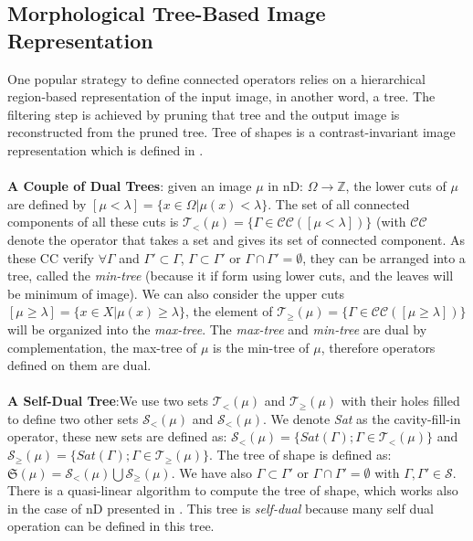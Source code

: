 \subsection{Morphological Tree-Based Image Representation}
One popular strategy to define connected operators relies on a hierarchical region-based representation of the input image, in another word, a tree. The filtering step is achieved by pruning that tree and the output image is reconstructed from the pruned tree.  Tree of shapes is a contrast-invariant image representation which is defined in \cite{Monasse.2000}.
\paragraph{} \textbf{A Couple of Dual Trees}: given an image $\mu $ in nD: $\Omega \rightarrow \mathbb{Z} $, the lower cuts of $\mu$ are defined by 
	$[\mu < \lambda] =\lbrace x \in \Omega \vert \mu (x) < \lambda \rbrace $. The set of all connected components of all these cuts is $ \mathcal{T}_< (\mu) =\lbrace \Gamma \in \mathcal{C}\mathcal{C}([\mu < \lambda]) \rbrace $ (with $\mathcal{C}\mathcal{C}$ denote the operator that takes a set and gives its set of connected component. As these CC verify $\forall \Gamma$ and $\Gamma ' \subset \Gamma$, $\Gamma \subset \Gamma ' $ or $\Gamma \cap \Gamma '= \emptyset$, they can be arranged into a tree, called the \textit{min-tree} (because it if form using lower cuts, and the leaves will be minimum of image). We can also consider the upper cuts $[\mu \geq \lambda] =\lbrace x \in X \vert \mu (x) \geq \lambda \rbrace $, the element of $ \mathcal{T}_\geq (\mu) =\lbrace \Gamma \in \mathcal{C}\mathcal{C}([\mu \geq \lambda]) \rbrace $ will be organized into the \textit{max-tree}. The \textit{max-tree} and \textit{min-tree} are dual by complementation, the max-tree of $\mu$ is the min-tree of $ \mu$, therefore operators defined on them are dual.
	
\paragraph{} \textbf{A Self-Dual Tree}:We use two sets $ \mathcal{T}_< (\mu)$ and $ \mathcal{T}_\geq (\mu)$ with their holes filled to define two other sets $ \mathcal{S}_< (\mu)$ and $ \mathcal{S}_< (\mu)$. We denote \textit{Sat} as the cavity-fill-in operator, these new sets are defined as: $ \mathcal{S}_< (\mu) = \lbrace Sat(\Gamma);\Gamma \in \mathcal{T}_<(\mu)\rbrace$ and $ \mathcal{S}_\geq (\mu) = \lbrace Sat(\Gamma);\Gamma \in \mathcal{T}_\geq (\mu)\rbrace$. The tree of shape is defined as: $\mathfrak{S}(\mu) = \mathcal{S}_< (\mu) \bigcup \mathcal{S}_\geq (\mu) $. We have also $\Gamma \subset \Gamma ' $ or $\Gamma \cap \Gamma '= \emptyset$ with $\Gamma , \Gamma ' \in \mathcal{S}$. There is a quasi-linear algorithm to compute the tree of shape, which works also in the case of nD presented in \cite{geraud.13.ismm}. This tree is \textit{self-dual} because many self dual operation can be defined in this tree. 

